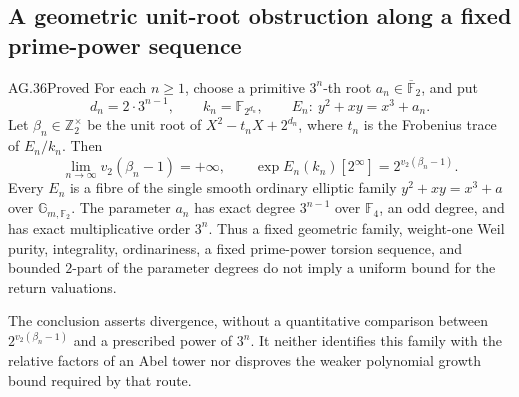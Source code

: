 \subsection{A geometric unit-root obstruction along a fixed prime-power sequence}

\begin{claim}{AG.36}{Proved}\label{clm:AGfixedthreepower}
For each \(n\geq1\), choose a primitive \(3^n\)-th root
\(a_n\in\overline{\mathbb F}_2\), and put
\[
 d_n=2\cdot3^{n-1},\qquad k_n=\mathbb F_{2^{d_n}},\qquad
 E_n:\ y^2+xy=x^3+a_n.
 \tag{AG.36.1}
\]
Let \(\beta_n\in\mathbb Z_2^\times\) be the unit root of
\(X^2-t_nX+2^{d_n}\), where \(t_n\) is the Frobenius trace
of \(E_n/k_n\). Then
\[
 \lim_{n\to\infty}v_2(\beta_n-1)=+\infty,
 \qquad
 \exp E_n(k_n)[2^\infty]=2^{v_2(\beta_n-1)}.
 \tag{AG.36.2}
\]
Every \(E_n\) is a fibre of the single smooth ordinary elliptic
family \(y^2+xy=x^3+a\) over \(\mathbb G_{m,\mathbb F_2}\).
The parameter \(a_n\) has exact degree \(3^{n-1}\) over
\(\mathbb F_4\), an odd degree, and has exact multiplicative
order \(3^n\). Thus a fixed geometric family, weight-one Weil
purity, integrality, ordinariness, a fixed prime-power torsion
sequence, and bounded \(2\)-part of the parameter degrees do
not imply a uniform bound for the return valuations.

The conclusion asserts divergence, without a quantitative
comparison between \(2^{v_2(\beta_n-1)}\) and a prescribed
power of \(3^n\). It neither identifies this family with the
relative factors of an Abel tower nor disproves the weaker
polynomial growth bound required by that route.
\end{claim}

